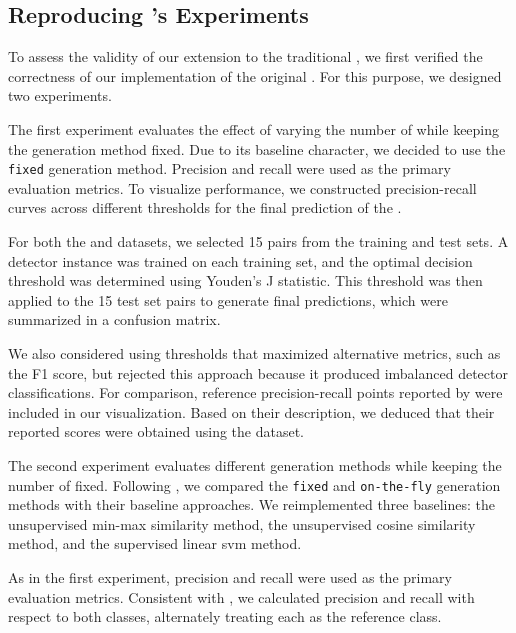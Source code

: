 \subsection{Reproducing \citet{koppel_determining_2014}'s Experiments}

To assess the validity of our extension to the traditional \impAppr{}, we first verified the correctness of our implementation of the original \impAppr{}. 
For this purpose, we designed two experiments.

The first experiment evaluates the effect of varying the number of \imps{} while keeping the \imp{} generation method fixed. 
Due to its baseline character, we decided to use the \texttt{fixed} \imp{} generation method.
Precision and recall were used as the primary evaluation metrics. 
To visualize performance, we constructed precision-recall curves across different thresholds for the final prediction of the \impAppr{}.

For both the \dataBlog{} and \dataStudent{} datasets, we selected 15 pairs from the training and test sets. 
A detector instance was trained on each training set, and the optimal decision threshold was determined using Youden's J statistic. 
This threshold was then applied to the 15 test set pairs to generate final predictions, which were summarized in a confusion matrix.

We also considered using thresholds that maximized alternative metrics, such as the F1 score, but rejected this approach because it produced imbalanced detector classifications. 
For comparison, reference precision-recall points reported by \citet{koppel_determining_2014} were included in our visualization. 
Based on their description, we deduced that their reported scores were obtained using the \dataBlog{} dataset.

The second experiment evaluates different \imp{} generation methods while keeping the number of \imps{} fixed. 
Following \citet{koppel_determining_2014}, we compared the \texttt{fixed} and \texttt{on-the-fly} \imp{} generation methods with their baseline approaches. 
We reimplemented three baselines: the unsupervised min-max similarity method, the unsupervised cosine similarity method, and the supervised linear \ac{svm} method.

As in the first experiment, precision and recall were used as the primary evaluation metrics. 
Consistent with \citet{koppel_determining_2014}, we calculated precision and recall with respect to both classes, alternately treating each as the reference class.
